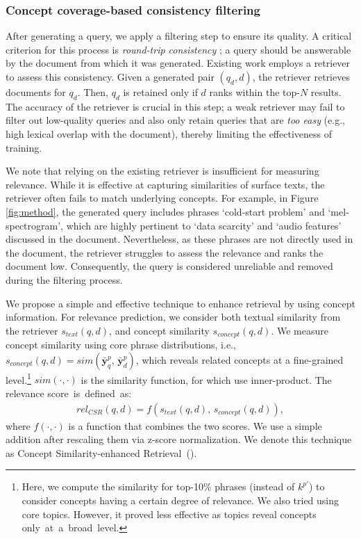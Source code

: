 \subsubsection{\textbf{Concept coverage-based consistency filtering}}
\label{subsub:method_filtering}
After generating a query, we apply a filtering step to ensure its quality.
A critical criterion for this process is \textit{round-trip consistency} \cite{alberti2019synthetic}; a query should be answerable by the document from which it was generated.
Existing work \cite{dai2022promptagator, label_condition_qgen} employs a retriever to assess this consistency.
Given a generated pair $(q_d, d)$, the retriever retrieves documents for $q_d$. 
Then, $q_d$ is retained only if $d$ ranks within the top-$N$ results.
The accuracy of the retriever is crucial in this step;
a weak retriever may fail to filter out low-quality queries and also only retain queries that are \textit{too easy} (e.g., high lexical overlap with the document), thereby limiting the effectiveness of training.

 


We note that relying on the existing retriever is insufficient for measuring relevance.
While it is effective at capturing similarities of surface texts, the retriever often fails to match underlying concepts.
For example, in Figure \ref{fig:method}, the generated query includes phrases `cold-start problem' and `mel-spectrogram', which are highly pertinent to `data scarcity' and `audio features' discussed in the document.
Nevertheless, as these phrases are not directly used in the document, the retriever struggles to assess the relevance and ranks the document low. 
Consequently, the query is considered unreliable and removed during the filtering process.


We propose a simple and effective technique to enhance retrieval by using concept information.
For relevance prediction, we consider both textual similarity from the retriever $s_{text}(q,d)$, and concept similarity $s_{concept}(q,d)$.
We measure concept similarity using core phrase distributions, i.e., $s_{concept}(q,d) = sim(\bar{\mathbf{y}}^p_q, \,\bar{\mathbf{y}}^p_d)$, which reveals related concepts at a fine-grained level.\footnote{Here, we compute the similarity for top-10\% phrases (instead of $k^{p'}$) to consider concepts having a certain degree of relevance.
We also tried using core topics. However, it proved less effective as topics reveal concepts only~at~a~broad~level.
}
$sim(\cdot, \cdot)$ is the similarity function, for which use inner-product.
The relevance score~is~defined~as:
\begin{equation}
\begin{aligned}
rel_{CSR}(q,d) = f(s_{text}(q,d), \,s_{concept}(q,d)),
\end{aligned}
\end{equation}
where $f(\cdot, \cdot)$ is a function that combines the two scores. 
We use a simple addition after rescaling them via z-score normalization.
We denote this technique as Concept Similarity-enhanced Retrieval~(\proposedtwo).

